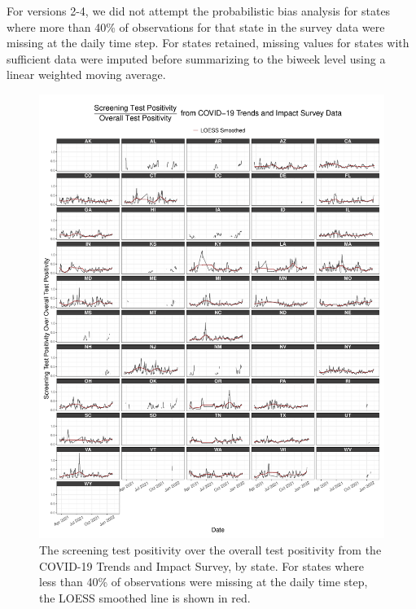 \documentclass[12pt,twoside]{smiththesis}
\begin{document}
For versions 2-4, we did not attempt the probabilistic bias analysis for states where more than 40\% of observations for that state in the survey data were missing at the daily time step. For states retained, missing values for states with sufficient data were imputed before summarizing to the biweek level using a linear weighted moving average.
\begin{figure}
\includegraphics[width=1\linewidth]{figure/ctis_beta_states} \caption{\label{fig:statectis}The screening test positivity over the overall test positivity from the COVID-19 Trends and Impact Survey, by state. For states where less than 40\% of observations were missing at the daily time step, the LOESS smoothed line is shown in red.}\label{fig:unnamed-chunk-2}
\end{figure}
\end{document}

